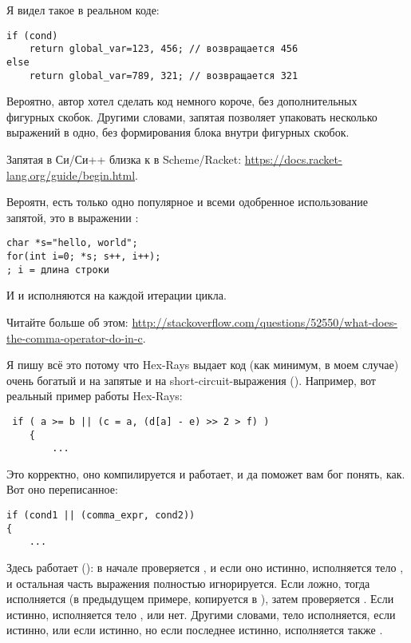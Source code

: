 Я видел такое в реальном коде:

\begin{lstlisting}
if (cond)
	return global_var=123, 456; // возвращается 456
else
	return global_var=789, 321; // возвращается 321
\end{lstlisting}

Вероятно, автор хотел сделать код немного короче, без дополнительных фигурных скобок.
Другими словами, запятая позволяет упаковать несколько выражений в одно, без формирования
блока внутри фигурных скобок.

Запятая в Си/Си++ близка к  в Scheme/Racket: \url{https://docs.racket-lang.org/guide/begin.html}.

Вероятн, есть только одно популярное и всеми одобренное использование запятой, это в выражении :

\begin{lstlisting}
char *s="hello, world";
for(int i=0; *s; s++, i++);
; i = длина строки
\end{lstlisting}

И  и  исполняются на каждой итерации цикла.

Читайте больше об этом: \url{http://stackoverflow.com/questions/52550/what-does-the-comma-operator-do-in-c}.

Я пишу всё это потому что Hex-Rays выдает код (как минимум, в моем случае) очень богатый и на запятые и на
short-circuit-выражения ().
Например, вот реальный пример работы Hex-Rays:

\begin{lstlisting}
 if ( a >= b || (c = a, (d[a] - e) >> 2 > f) )
    {
    	...
\end{lstlisting}

Это корректно, оно компилируется и работает, и да поможет вам бог понять, как.
Вот оно переписанное:

\begin{lstlisting}
if (cond1 || (comma_expr, cond2))
{
	...
\end{lstlisting}

Здесь работает  (): в начале проверяется , и если оно истинно,
исполняется тело , и остальная часть выражения  полностью игнорируется.
Если  ложно, тогда исполняется  (в предыдущем примере,  копируется в ),
затем проверяется .
Если  истинно, исполняется тело , или нет.
Другими словами, тело  исполняется, если  истинно, или если  истинно,
но если последнее истинно, исполняется также .

